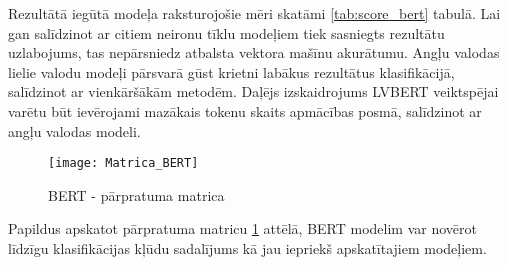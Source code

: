 Rezultātā iegūtā modeļa raksturojošie mēri skatāmi \ref{tab:score_bert} tabulā. Lai gan salīdzinot ar citiem neironu tīklu modeļiem tiek sasniegts rezultātu uzlabojums, tas nepārsniedz atbalsta vektora mašīnu akurātumu. Angļu valodas lielie valodu modeļi pārsvarā gūst krietni labākus rezultātus klasifikācijā, salīdzinot ar vienkāršākām metodēm. Daļējs izskaidrojums LVBERT veiktspējai varētu būt ievērojami mazākais tokenu skaits apmācības posmā, salīdzinot ar angļu valodas modeli.

\begin{figure}[H]
	\centering
	\texttt{[image: Matrica\_BERT]}
	\caption{BERT - pārpratuma matrica}
	\label{fig:Matrica_BERT}
\end{figure}

Papildus apskatot pārpratuma matricu \ref{fig:Matrica_BERT} attēlā, BERT modelim var novērot līdzīgu klasifikācijas kļūdu sadalījums kā jau iepriekš apskatītajiem modeļiem.
